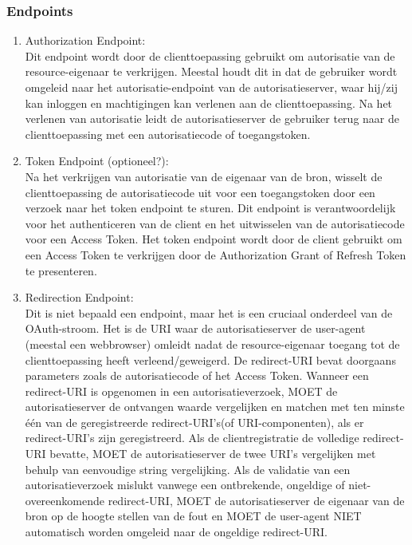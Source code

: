 \subsubsection{Endpoints}%
\label{subsubsec:endpoints}
\begin{enumerate}[label=\textbf{-}]
    \item Authorization Endpoint: \\
    Dit endpoint wordt door de clienttoepassing gebruikt om autorisatie van de resource-eigenaar te verkrijgen. Meestal houdt dit in dat de gebruiker wordt omgeleid naar het autorisatie-endpoint van de autorisatieserver, waar hij/zij kan inloggen en machtigingen kan verlenen aan de clienttoepassing. Na het verlenen van autorisatie leidt de autorisatieserver de gebruiker terug naar de clienttoepassing met een autorisatiecode of toegangstoken.
  
    \item Token Endpoint (optioneel?): \\
    Na het verkrijgen van autorisatie van de eigenaar van de bron, wisselt de clienttoepassing de autorisatiecode uit voor een toegangstoken door een verzoek naar het token endpoint te sturen. Dit endpoint is verantwoordelijk voor het authenticeren van de client en het uitwisselen van de autorisatiecode voor een Access Token. Het token endpoint wordt door de client gebruikt om een Access Token te verkrijgen door de Authorization Grant of Refresh Token te presenteren.
  
    \item Redirection Endpoint: \\
    Dit is niet bepaald een endpoint, maar het is een cruciaal onderdeel van de OAuth-stroom. Het is de URI waar de autorisatieserver de user-agent (meestal een webbrowser) omleidt nadat de resource-eigenaar toegang tot de clienttoepassing heeft verleend/geweigerd. De redirect-URI bevat doorgaans parameters zoals de autorisatiecode of het Access Token. Wanneer een redirect-URI is opgenomen in een autorisatieverzoek, MOET de autorisatieserver de ontvangen waarde vergelijken en matchen met ten minste één van de geregistreerde redirect-URI's(of URI-componenten), als er redirect-URI's zijn geregistreerd. Als de clientregistratie de volledige redirect-URI bevatte, MOET de autorisatieserver de twee URI's vergelijken met behulp van eenvoudige string vergelijking. Als de validatie van een autorisatieverzoek mislukt vanwege een ontbrekende, ongeldige of niet-overeenkomende redirect-URI, MOET de autorisatieserver de eigenaar van de bron op de hoogte stellen van de fout en MOET de user-agent NIET automatisch worden omgeleid naar de ongeldige redirect-URI.
  \end{enumerate}

